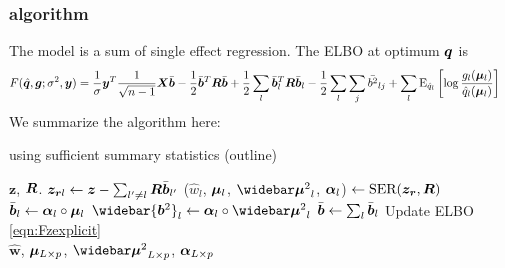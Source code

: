 \subsubsection{\susie algorithm}
The \susie model is a sum of single effect regression. The ELBO at optimum ${\bm q}$ is
\begin{align}
    F(\hat{{\bm q}},\bm g;\sigma^2, \bm y) &= \frac{1}{\sigma}\bm y^T\frac{1}{\sqrt{n-1}}\bm X \bar{\bm b} - \frac{1}{2}\bar{\bm b}^T \bm R \bar{\bm b} + \frac{1}{2} \sum_l \bar{\bm b}_l^T \bm R \bar{\bm b}_l - \frac{1}{2} \sum_l \sum_j \bar{b^2}_{lj} + \sum_l \text{E}_{\hat{q}_l}\left[\log\frac{g_l(\bm \mu_l)}{\hat{q}_l(\bm \mu_l)} \right] \label{eqn:Fzexplicit}
\end{align}
We summarize the algorithm here:
\begin{algorithm}[H] 
\caption{\susie using sufficient summary statistics (outline)} \label{alg:susiezalg}
\begin{algorithmic}[1]
\Require $\bm{z}$, $\bm R$.
\Repeat
{}
	\State $\bm{z}_{\bm r l} \gets \bm{z} - \sum_{l'\neq l} \bm R \bar{\bm b}_{l'}$ 
    \State ($\hat{w}_{l}$, $\bm \mu_l$, $\emusq_l$, $\bm \alpha_l$) $\gets \text{SER}(\bm{z}_{\bm r}, \bm R)$ 
    \State $\bar{\bm b}_l \gets \bm \alpha_l \circ \bm \mu_l$ 
    \State $\widebar{\vb^2}_l \gets \valpha_l \circ \emusq_l$ 
\EndFor
\State $\bar{\bm b} \gets \sum_l \bar{\bm b}_l$
\State Update ELBO \eqref{eqn:Fzexplicit}
 \\
\Return $\hat{\bm{w}}$, $\bm \mu_{L\times p}$, $\emusq_{L\times p}$, $\bm \alpha_{L\times p}$
\end{algorithmic}
\end{algorithm}

